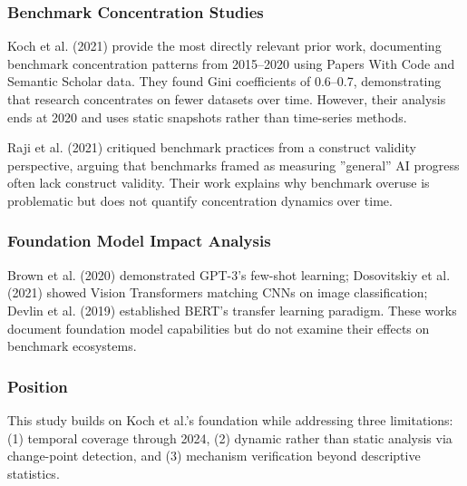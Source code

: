 
\subsubsection{Benchmark Concentration Studies}

Koch et al. (2021) provide the most directly relevant prior work, documenting benchmark concentration patterns from 2015--2020 using Papers With Code and Semantic Scholar data. They found Gini coefficients of 0.6--0.7, demonstrating that research concentrates on fewer datasets over time. However, their analysis ends at 2020 and uses static snapshots rather than time-series methods.

Raji et al. (2021) critiqued benchmark practices from a construct validity perspective, arguing that benchmarks framed as measuring ''general'' AI progress often lack construct validity. Their work explains why benchmark overuse is problematic but does not quantify concentration dynamics over time.

\subsubsection{Foundation Model Impact Analysis}

Brown et al. (2020) demonstrated GPT-3's few-shot learning; Dosovitskiy et al. (2021) showed Vision Transformers matching CNNs on image classification; Devlin et al. (2019) established BERT's transfer learning paradigm. These works document foundation model capabilities but do not examine their effects on benchmark ecosystems.

\subsubsection{Position}

This study builds on Koch et al.'s foundation while addressing three limitations: (1) temporal coverage through 2024, (2) dynamic rather than static analysis via change-point detection, and (3) mechanism verification beyond descriptive statistics.
